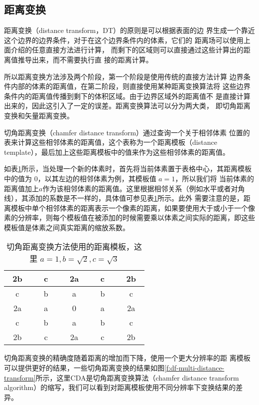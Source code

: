 \subsection{距离变换}
距离变换（distance transform，DT）的原则是可以根据表面的边 界生成一个靠近这个边界的边界条件，对于在这个边界条件内的体素，它们的 距离场可以使用上面介绍的任意直接方法进行计算， 而剩下的区域则可以直接通过这些计算出的距离值推导出来，而不需要执行直 接的距离计算。

所以距离变换方法涉及两个阶段，第一个阶段是使用传统的直接方法计算 边界条件内部的体素的距离值，在第二阶段，则直接使用某种距离变换算法将 这些边界条件内的距离值传播到剩下的体积区域。由于边界区域外的距离值不 是直接计算出来的，因此这引入了一定的误差。距离变换算法可以分为两大类， 即切角距离变换和矢量距离变换。

切角距离变换（chamfer distance transform）通过查询一个关于相邻体素 位置的表来计算这些相邻体素的距离值，这个表称为一个距离模板（distance template），最后加上这些距离模板中的值来作为这些相邻体素的距离值。

如表\ref{t:distance-template}所示，当处理一个新的体素时，首先将当前体素置于表格中心，其距离模板中的值为 0，以其左边的相邻体素为例，其模板值 $a = 1$，所以我们将 当前体素的距离值加上$a$作为该相邻体素的距离值。这里根据相邻关系（例如水平或者对角线），其添加的系数是不一样的，具体值可参见表\ref{t:distance-template}所示。此外 需要注意的是，距离模板中单个相邻体素的距离表示一个像素的距离，如果要使用大于或小于一个像素的分辨率，则每个模板值在被添加的时候需要乘以体素之间实际的距离，即这些模板值是体素之间真实距离的缩放系数。

\begin{table}
\begin{center}
	\begin{tabular}{|c|c|c|c|c|}
		\hline
		~2b~ & ~~c~~ & ~2a~ & ~~c~~ & ~2b~\\
		\hline
		c&b&a&b&c\\
		\hline
		2a&a&0&a&2a\\
		\hline
		c&b&a&b&c\\
		\hline
		2b&c&2a&c&2b\\
		\hline
	\end{tabular}
\end{center}
\caption{切角距离变换方法使用的距离模板，这里 $a=1,b=\sqrt{2},c=\sqrt{3}$}
\label{t:distance-template}
\end{table}

切角距离变换的精确度随着距离的增加而下降，使用一个更大分辨率的距 离模板可以提供更好的结果，一些切角距离变换的结果如图\ref{f:df-multi-distance-transform}所示，这里CDA是切角距离变换算法（chamfer distance transform algorithm）的缩写，我们可以看到对距离模板使用不同分辨率下变换结果的差异。

